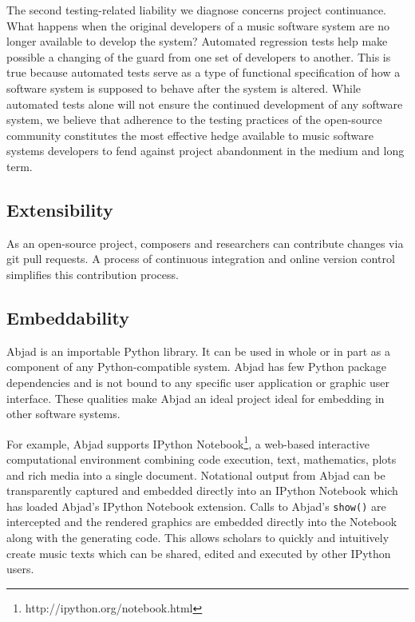 \documentclass{article}
\begin{document}
The second testing-related liability we diagnose concerns project continuance.
What happens when the original developers of a music software system are no
longer available to develop the system? Automated regression tests help make
possible a changing of the guard from one set of developers to another. This is
true because automated tests serve as a type of functional specification of how
a software system is supposed to behave after the system is altered. While
automated tests alone will not ensure the continued development of any software
system, we believe that adherence to the testing practices of the open-source
community constitutes the most effective hedge available to music software
systems developers to fend against project abandonment in the medium and long
term.

\subsection{Extensibility}

As an open-source project, composers and researchers can contribute changes via
git pull requests. A process of continuous integration and online version
control simplifies this contribution process.

\subsection{Embeddability}

Abjad is an importable Python library. It can be used in whole or in part as a
component of any Python-compatible system. Abjad has few Python package
dependencies and is not bound to any specific user application or graphic user
interface. These qualities make Abjad an ideal project ideal for embedding in
other software systems.

For example, Abjad supports IPython
Notebook\footnote{http://ipython.org/notebook.html}, a web-based interactive
computational environment combining code execution, text, mathematics, plots
and rich media into a single document. Notational output from Abjad can be
transparently captured and embedded directly into an IPython Notebook which has
loaded Abjad's IPython Notebook extension. Calls to Abjad's \texttt{show()} are
intercepted and the rendered graphics are embedded directly into the Notebook
along with the generating code. This allows scholars to quickly and intuitively
create music texts which can be shared, edited and executed by other IPython
users.
\end{document}
